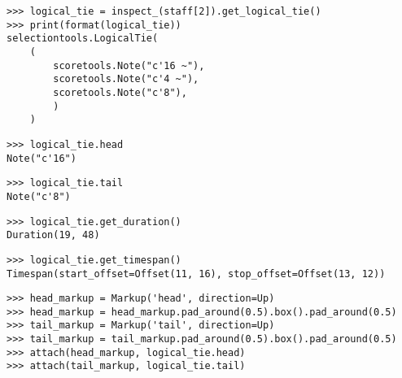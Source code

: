 \begin{comment}
<abjad>
logical_tie = inspect_(staff[2]).get_logical_tie()
print(format(logical_tie))
logical_tie.head
logical_tie.tail
logical_tie.get_duration()
logical_tie.get_timespan()
head_markup = Markup('head', direction=Up)
head_markup = head_markup.pad_around(0.5).box().pad_around(0.5)
tail_markup = Markup('tail', direction=Up)
tail_markup = tail_markup.pad_around(0.5).box().pad_around(0.5)
attach(head_markup, logical_tie.head)
attach(tail_markup, logical_tie.tail)
</abjad>
\end{comment}

\begin{abjadbookoutput}
\begin{singlespacing}
\vspace{-0.5\baselineskip}
\begin{lstlisting}
>>> logical_tie = inspect_(staff[2]).get_logical_tie()
>>> print(format(logical_tie))
selectiontools.LogicalTie(
    (
        scoretools.Note("c'16 ~"),
        scoretools.Note("c'4 ~"),
        scoretools.Note("c'8"),
        )
    )
\end{lstlisting}
\begin{lstlisting}
>>> logical_tie.head
Note("c'16")
\end{lstlisting}
\begin{lstlisting}
>>> logical_tie.tail
Note("c'8")
\end{lstlisting}
\begin{lstlisting}
>>> logical_tie.get_duration()
Duration(19, 48)
\end{lstlisting}
\begin{lstlisting}
>>> logical_tie.get_timespan()
Timespan(start_offset=Offset(11, 16), stop_offset=Offset(13, 12))
\end{lstlisting}
\begin{lstlisting}
>>> head_markup = Markup('head', direction=Up)
>>> head_markup = head_markup.pad_around(0.5).box().pad_around(0.5)
>>> tail_markup = Markup('tail', direction=Up)
>>> tail_markup = tail_markup.pad_around(0.5).box().pad_around(0.5)
>>> attach(head_markup, logical_tie.head)
>>> attach(tail_markup, logical_tie.tail)
\end{lstlisting}
\end{singlespacing}
\end{abjadbookoutput}

\begin{comment}
<abjad>
trivial_logical_tie = inspect_(staff[0]).get_logical_tie()
print(format(trivial_logical_tie))
attach(head_markup, trivial_logical_tie.head)
attach(tail_markup, trivial_logical_tie.tail)
</abjad>
\end{comment}

